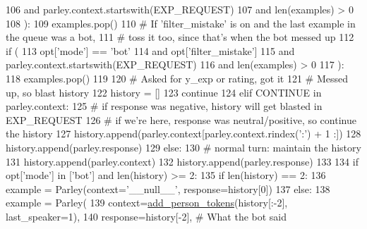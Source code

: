 \begin{DoxyCode}
106                     \textcolor{keywordflow}{and} parley.context.startswith(EXP\_REQUEST)
107                     \textcolor{keywordflow}{and} len(examples) > 0
108                 ):
109                     examples.pop()
110                 \textcolor{comment}{# If 'filter\_mistake' is on and the last example in the queue was a bot,}
111                 \textcolor{comment}{# toss it too, since that's when the bot messed up}
112                 \textcolor{keywordflow}{if} (
113                     opt[\textcolor{stringliteral}{'mode'}] == \textcolor{stringliteral}{'bot'}
114                     \textcolor{keywordflow}{and} opt[\textcolor{stringliteral}{'filter\_mistake'}]
115                     \textcolor{keywordflow}{and} parley.context.startswith(EXP\_REQUEST)
116                     \textcolor{keywordflow}{and} len(examples) > 0
117                 ):
118                     examples.pop()
119 
120                 \textcolor{comment}{# Asked for y\_exp or rating, got it}
121                 \textcolor{comment}{# Messed up, so blast history}
122                 history = []
123                 \textcolor{keywordflow}{continue}
124             \textcolor{keywordflow}{elif} CONTINUE \textcolor{keywordflow}{in} parley.context:
125                 \textcolor{comment}{# if response was negative, history will get blasted in EXP\_REQUEST}
126                 \textcolor{comment}{# if we're here, response was neutral/positive, so continue the history}
127                 history.append(parley.context[parley.context.rindex(\textcolor{stringliteral}{':'}) + 1 :])
128                 history.append(parley.response)
129             \textcolor{keywordflow}{else}:
130                 \textcolor{comment}{# normal turn: maintain the history}
131                 history.append(parley.context)
132                 history.append(parley.response)
133 
134             \textcolor{keywordflow}{if} opt[\textcolor{stringliteral}{'mode'}] \textcolor{keywordflow}{in} [\textcolor{stringliteral}{'bot'}] \textcolor{keywordflow}{and} len(history) >= 2:
135                 \textcolor{keywordflow}{if} len(history) == 2:
136                     example = Parley(context=\textcolor{stringliteral}{'\_\_null\_\_'}, response=history[0])
137                 \textcolor{keywordflow}{else}:
138                     example = Parley(
139                         context=\hyperlink{namespaceprojects_1_1self__feeding_1_1utils_a3f3d055dc6c4058057baae7b240de5ec}{add\_person\_tokens}(history[:-2], last\_speaker=1),
140                         response=history[-2],  \textcolor{comment}{# What the bot said}

\end{DoxyCode}
